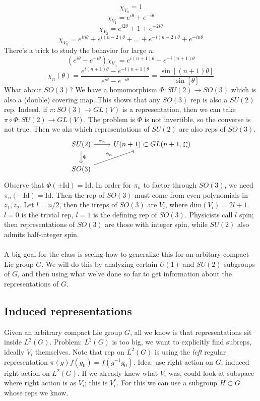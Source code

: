 \documentclass[12 pt]{article}
\DeclareMathOperator {\C} {\mathbb{C}}
\theoremstyle{plain}
\theoremstyle{definition}
\theoremstyle{remark}
\begin{document}
\[       \chi_{V_0} = 1      \]
\[     \chi_{V_1} = e^{i\theta} + e^{-i\theta}     \]
\[        \chi_{V_2} = e^{i2\theta} + 1 + e^{-2i\theta}    \]
\[        \chi_{V_n} = e^{in\theta} + e^{i(n-2) \theta} + \dots + e^{-i(n-2)\theta} + e^{-in\theta}      \]
There's a trick to study the behavior for large $n$:
\[      (e^{i\theta} - e^{-i\theta} ) \chi_{V_n} = e^{i(n+1)\theta} - e^{-i(n+1)\theta}    \]
\[        \chi_n (\theta) = \frac{e^{i(n+1)\theta} - e^{-i(n+1)\theta}}{e^{i\theta} - e^{-i\theta}}  = \frac{\sin[(n+1)\theta]}{\sin[\theta]}    \]
What about $SO(3)$? We have a homomorphism $\Phi : SU(2) \to SO(3)$ which is also a (double) covering map. This shows that any $SO(3)$ rep is also a $SU(2)$ rep. Indeed, if $\pi : SO(3) \to GL(V)$ is a representation, then we can take $\pi \circ \Phi : SU(2) \to GL(V)$. The problem is $\Phi$ is not invertible, so the converse is not true. Then we aks which representations of $SU(2)$ are also reps of $SO(3)$.
\[
\begin{tikzcd}
SU(2) \arrow{r}{\pi_n} \arrow{d}{\Phi} & U(n+1) \subset GL(n+1, \C)  \\
SO(3) \arrow{ru}{\phi_n}
\end{tikzcd}
\]
Observe that $\Phi(\pm \text{Id}) = \text{Id}$. In order for $\pi_n$ to factor through $SO(3)$, we need $\pi_n (- \text{Id}) = \text{Id}$. Then the rep of $SO(3)$ must come from even polynomials in $z_1, z_2$. Let $ l = n/2$, then the irreps of $SO(3)$ are $V_l$, where dim$(V_l) = 2l+1$. $l=0$ is the trivial rep, $l = 1$ is the defining rep of $SO(3)$. Physicists call $l$ spin; then representations of $SO(3)$ are those with integer spin, while $SU(2)$ also admits half-integer spin.
\\
\\
A big goal for the class is seeing how to generalize this for an arbitary compact Lie group $G$. We will do this by analyzing certain $U(1)$ and $SU(2)$ subgroups of $G$, and then using what we've done so far to get information about the representations of $G$.

\subsection*{Induced representations}
Given an arbitrary compact Lie group $G$, all we know is that representations sit inside $L^2(G)$. Problem: $L^2(G)$ is too big, we want to explicitly find subreps, ideally $V_i$ themselves. Note that rep on $L^2(G)$ is using the \emph{left} regular representation $\pi(g) f(g_0) = f(g^{-1}g_0)$. Idea: use right action on $G$, induced right action on $L^2(G)$. If we already knew what $V_i$ was, could look at subspace where right action is as $V_i$; this is $V_i^*$. For this we can use a subgroup $H \subset G$ whose reps we know.
\end{document}
